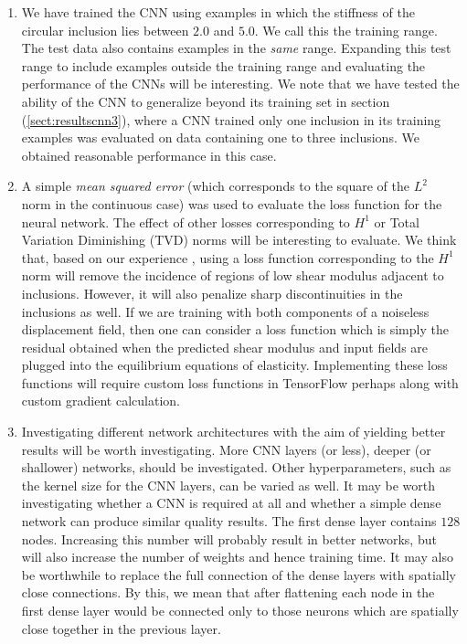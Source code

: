 \documentclass[12pt]{article}
\begin{document}
\begin{enumerate}
\item{We have trained the CNN using examples in which the stiffness of the circular inclusion lies between $2.0$ and $5.0$. We call this the training range. The test data also contains examples in the \textit{same} range. Expanding this test range to include examples outside the training range and evaluating the performance of the CNNs will be interesting. We note that we have tested the ability of the CNN to generalize beyond its training set in section (\ref{sect:resultscnn3}), where a CNN trained only one inclusion in its training examples was evaluated on data containing one to three inclusions. We obtained reasonable performance in this case.}
\item{A simple \textit{mean squared error} (which corresponds to the square of the $L^2$ norm in the continuous case) was used to evaluate the loss function for the neural network. The effect of other losses corresponding to $H^1$ or Total Variation Diminishing (TVD) norms will be interesting to evaluate. We think that, based on our experience \cite{diss:gokhale2007}, using a loss function corresponding to the $H^1$ norm will remove the incidence of regions of low shear modulus adjacent to inclusions. However, it will also penalize sharp discontinuities in the inclusions as well. If we are training with both components of a noiseless displacement field, then one can consider a loss function which is simply the residual obtained when the predicted shear modulus and input fields are plugged into the equilibrium equations of elasticity. Implementing these loss functions will require custom loss functions in TensorFlow perhaps along with custom gradient calculation.}
\item{Investigating different network architectures with the aim of yielding better results will be worth investigating. More CNN layers (or less), deeper (or shallower) networks, should be investigated. Other hyperparameters, such as the kernel size for the CNN layers, can be varied as well. It may be worth investigating whether a CNN is required at all and whether a simple dense network can produce similar quality results. The first dense layer contains $128$ nodes. Increasing this number will probably result in better networks, but will also increase the number of weights and hence training time. It may also be worthwhile to replace the full connection of the dense layers with spatially close connections. By this, we mean that after flattening each node in the first dense layer would be connected only to those neurons which are spatially close together in the previous layer.}

\end{enumerate}
\end{document}
